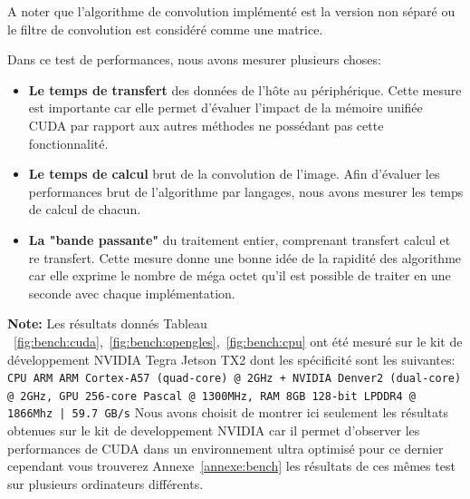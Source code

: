 A noter que l'algorithme de convolution implémenté est la version non séparé ou le filtre de convolution est considéré comme une matrice.

Dans ce test de performances, nous avons mesurer plusieurs choses:
\begin{itemize}
\item \textbf{Le temps de transfert} des données de l'hôte au périphérique. Cette mesure est importante car elle permet d'évaluer l'impact de la mémoire unifiée CUDA par rapport aux autres méthodes ne possédant pas cette fonctionnalité.
\item \textbf{Le temps de calcul} brut de la convolution de l'image. Afin d'évaluer les performances brut de l'algorithme par langages, nous avons mesurer les temps de calcul de chacun.
\item \textbf{La "bande passante"} du traitement entier, comprenant transfert calcul et re transfert. Cette mesure donne une bonne idée de la rapidité des algorithme car elle exprime le nombre de méga octet qu'il est possible de traiter en une seconde avec chaque implémentation.
\end{itemize}

\textbf{Note:} Les résultats donnés Tableau ~\ref{fig:bench:cuda},~\ref{fig:bench:opengles},~\ref{fig:bench:cpu} ont été mesuré sur le kit de développement NVIDIA Tegra Jetson TX2 dont les spécificité sont les suivantes: \texttt{CPU ARM ARM Cortex-A57 (quad-core) @ 2GHz + NVIDIA Denver2 (dual-core) @ 2GHz, GPU 256-core Pascal @ 1300MHz, RAM 8GB 128-bit LPDDR4 @ 1866Mhz |  59.7 GB/s} Nous avons choisit de montrer ici seulement les résultats obtenues sur le kit de developpement NVIDIA car il permet d'observer les performances de CUDA dans un environnement ultra optimisé pour ce dernier cependant vous trouverez Annexe~\ref{annexe:bench}
les résultats de ces mêmes test sur plusieurs ordinateurs différents.


